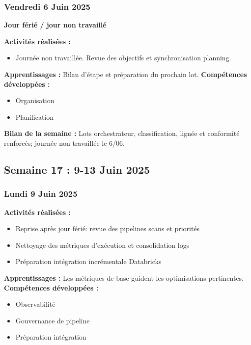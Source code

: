 \documentclass[12pt,a4paper]{article}
\begin{document}
\subsubsection{Vendredi 6 Juin 2025}
\textbf{Jour férié / jour non travaillé}

\textbf{Activités réalisées :}
\begin{itemize}
    \item Journée non travaillée. Revue des objectifs et synchronisation planning.
\end{itemize}

\textbf{Apprentissages :} Bilan d'étape et préparation du prochain lot.
\textbf{Compétences développées :}
\begin{itemize}
    \item Organisation
    \item Planification
\end{itemize}
\textbf{Bilan de la semaine :} Lots orchestrateur, classification, lignée et conformité renforcés; journée non travaillée le 6/06.

\clearpage
\subsection{Semaine 17 : 9-13 Juin 2025}

\subsubsection{Lundi 9 Juin 2025}
\textbf{Activités réalisées :}
\begin{itemize}
    \item Reprise après jour férié: revue des pipelines scans et priorités
    \item Nettoyage des métriques d'exécution et consolidation logs
    \item Préparation intégration incrémentale Databricks
\end{itemize}
\textbf{Apprentissages :} Les métriques de base guident les optimisations pertinentes.
\textbf{Compétences développées :}
\begin{itemize}
    \item Observabilité
    \item Gouvernance de pipeline
    \item Préparation intégration
\end{itemize}
\end{document}
